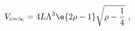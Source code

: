 \begin{equation}
\label{Vinf}
  V_{c=\infty} = 
  4L\Lambda^3 \e{2\rho-1} \sqrt{\rho-\frac14}~,
\end{equation}

